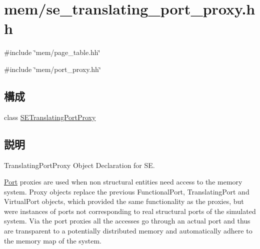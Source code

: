 \hypertarget{se__translating__port__proxy_8hh}{
\section{mem/se\_\-translating\_\-port\_\-proxy.hh}
\label{se__translating__port__proxy_8hh}
}
{\ttfamily \#include \char`\"{}mem/page\_\-table.hh\char`\"{}}\par
{\ttfamily \#include \char`\"{}mem/port\_\-proxy.hh\char`\"{}}\par
\subsection*{構成}
\begin{DoxyCompactItemize}
\item 
class \hyperlink{classSETranslatingPortProxy}{SETranslatingPortProxy}
\end{DoxyCompactItemize}


\subsection{説明}
TranslatingPortProxy Object Declaration for SE.

\hyperlink{classPort}{Port} proxies are used when non structural entities need access to the memory system. Proxy objects replace the previous FunctionalPort, TranslatingPort and VirtualPort objects, which provided the same functionality as the proxies, but were instances of ports not corresponding to real structural ports of the simulated system. Via the port proxies all the accesses go through an actual port and thus are transparent to a potentially distributed memory and automatically adhere to the memory map of the system. 
